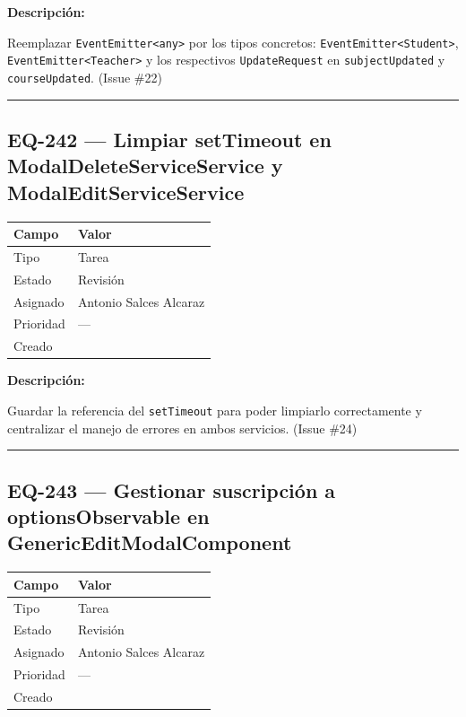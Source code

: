 \documentclass[
  spanish,
  11pt,
]{report}
\newcounter{none} %
\begin{document}
\textbf{Descripción:}

Reemplazar \texttt{EventEmitter\textless{}any\textgreater{}} por los
tipos concretos: \texttt{EventEmitter\textless{}Student\textgreater{}},
\texttt{EventEmitter\textless{}Teacher\textgreater{}} y los respectivos
\texttt{UpdateRequest} en \texttt{subjectUpdated} y
\texttt{courseUpdated}. (Issue \#22)

\begin{center}\rule{0.5\linewidth}{0.5pt}\end{center}

\subsection{EQ-242 --- Limpiar setTimeout en ModalDeleteServiceService y
ModalEditServiceService}\label{eq-242-limpiar-settimeout-en-modaldeleteserviceservice-y-modaleditserviceservice}

{\def\LTcaptype{none} %
\begin{longtable}[]{@{}ll@{}}
\toprule\noalign{}
Campo & Valor \\
\midrule\noalign{}
\endhead
\bottomrule\noalign{}
\endlastfoot
Tipo & Tarea \\
Estado & Revisión \\
Asignado & Antonio Salces Alcaraz \\
Prioridad & --- \\
Creado & \\
\end{longtable}
}

\textbf{Descripción:}

Guardar la referencia del \texttt{setTimeout} para poder limpiarlo
correctamente y centralizar el manejo de errores en ambos servicios.
(Issue \#24)

\begin{center}\rule{0.5\linewidth}{0.5pt}\end{center}

\subsection{EQ-243 --- Gestionar suscripción a optionsObservable en
GenericEditModalComponent}\label{eq-243-gestionar-suscripciuxf3n-a-optionsobservable-en-genericeditmodalcomponent}

{\def\LTcaptype{none} %
\begin{longtable}[]{@{}ll@{}}
\toprule\noalign{}
Campo & Valor \\
\midrule\noalign{}
\endhead
\bottomrule\noalign{}
\endlastfoot
Tipo & Tarea \\
Estado & Revisión \\
Asignado & Antonio Salces Alcaraz \\
Prioridad & --- \\
Creado & \\
\end{longtable}
}
\end{document}
